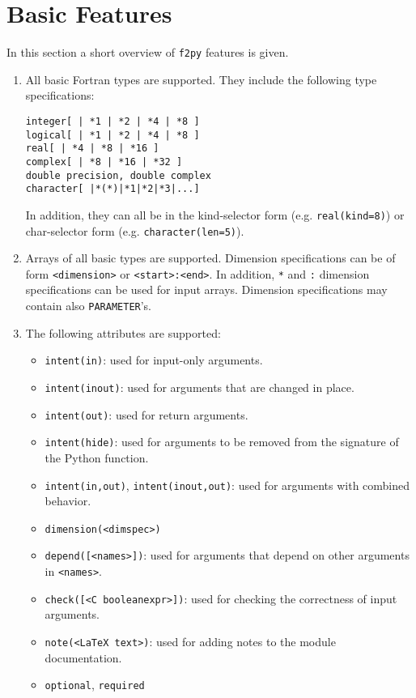 \documentclass[twocolumn]{article}
\newcommand{\fpy}{\texttt{f2py}\xspace}
\begin{document}
\section{Basic Features}
\label{sec:features}

In this section a short overview of \fpy features is given.
\begin{enumerate}
\item All basic Fortran types are supported. They include
the following type specifications:
\begin{verbatim}
integer[ | *1 | *2 | *4 | *8 ]
logical[ | *1 | *2 | *4 | *8 ]
real[ | *4 | *8 | *16 ]
complex[ | *8 | *16 | *32 ]
double precision, double complex
character[ |*(*)|*1|*2|*3|...]
\end{verbatim}
In addition, they can all be in the kind-selector form
(e.g. \texttt{real(kind=8)}) or char-selector form
(e.g. \texttt{character(len=5)}).
\item Arrays of all basic types are supported. Dimension
  specifications can be of form \texttt{<dimension>} or
  \texttt{<start>:<end>}. In addition, \texttt{*} and \texttt{:}
  dimension specifications can be used for input arrays.
  Dimension specifications may contain also \texttt{PARAMETER}'s.
\item The following attributes are supported:
  \begin{itemize}
  \item
  \texttt{intent(in)}: used for input-only arguments.
  \item
  \texttt{intent(inout)}: used for arguments that are changed in
  place.
  \item
  \texttt{intent(out)}: used for return arguments.
  \item
  \texttt{intent(hide)}: used for arguments to be removed from
  the signature of the Python function.
  \item
  \texttt{intent(in,out)}, \texttt{intent(inout,out)}: used for
  arguments with combined behavior.
  \item
  \texttt{dimension(<dimspec>)}
  \item
  \texttt{depend([<names>])}: used
  for arguments that depend on other arguments in \texttt{<names>}.
  \item
  \texttt{check([<C booleanexpr>])}: used for checking the
  correctness of input arguments.
  \item
  \texttt{note(<LaTeX text>)}: used for
  adding notes to the module documentation.
  \item
    \texttt{optional}, \texttt{required}

\end{itemize}
\end{enumerate}
\end{document}
